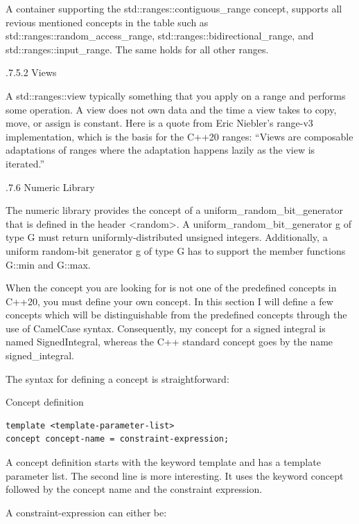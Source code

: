 A container supporting the std::ranges::contiguous\_range concept, supports all revious mentioned concepts in the table such as std::ranges::random\_access\_range, std::ranges::bidirectional\_range, and std::ranges::input\_range. The same holds for all other ranges.

.7.5.2\hspace{0.2cm} Views

A std::ranges::view typically something that you apply on a range and performs some operation. A view does not own data and the time a view takes to copy, move, or assign is constant. Here is a quote from Eric Niebler’s range-v3 implementation, which is the basis for the C++20 ranges: “Views are composable adaptations of ranges where the adaptation happens lazily as the view is iterated.”

.7.6\hspace{0.2cm} Numeric Library

The numeric library provides the concept of a uniform\_random\_bit\_generator that is defined in the header <random>. A uniform\_random\_bit\_generator g of type G must return uniformly-distributed unsigned integers. Additionally, a uniform random-bit generator g of type G has to support the member functions G::min and G::max.


When the concept you are looking for is not one of the predefined concepts in C++20, you must define your own concept. In this section I will define a few concepts which will be distinguishable from the predefined concepts through the use of CamelCase syntax. Consequently, my concept for a signed integral is named SignedIntegral, whereas the C++ standard concept goes by the name signed\_integral.

The syntax for defining a concept is straightforward:

\noindent
Concept definition
\begin{lstlisting}[style=styleCXX]
template <template-parameter-list>
concept concept-name = constraint-expression;
\end{lstlisting}

A concept definition starts with the keyword template and has a template parameter list. The second line is more interesting. It uses the keyword concept followed by the concept name and the constraint expression.

A constraint-expression can either be:

